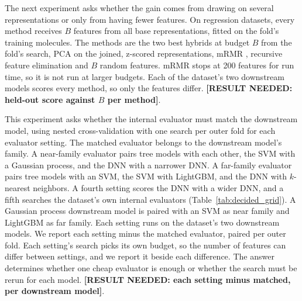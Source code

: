 The next experiment asks whether the gain comes from drawing on several representations or only from having fewer features. On regression datasets, every method receives $B$ features from all base representations, fitted on the fold's training molecules. %
The methods are the two best hybrids at budget $B$ from the fold's search, PCA on the joined, z-scored representations, mRMR \citep{Peng2005}, recursive feature elimination \citep{Guyon2002} and $B$ random features. mRMR stops at 200 features for run time, so it is not run at larger budgets. Each of the dataset's two downstream models scores every method, so only the features differ. \textbf{[RESULT NEEDED: held-out score against $B$ per method]}.

This experiment asks whether the internal evaluator must match the downstream model, using nested cross-validation with one search per outer fold for each evaluator setting. The matched evaluator belongs to the downstream model's family. A near-family evaluator pairs tree models with each other, the SVM with a Gaussian process, and the DNN with a narrower DNN. A far-family evaluator pairs tree models with an SVM, the SVM with LightGBM, and the DNN with $k$-nearest neighbors. %
A fourth setting scores the DNN with a wider DNN, and a fifth searches the dataset's own internal evaluators (Table~\ref{tab:decided_grid}). A Gaussian process downstream model is paired with an SVM as near family and LightGBM as far family. Each setting runs on the dataset's two downstream models. We report each setting minus the matched evaluator, paired per outer fold. Each setting's search picks its own budget, so the number of features can differ between settings, and we report it beside each difference. The answer determines whether one cheap evaluator is enough or whether the search must be rerun for each model. \textbf{[RESULT NEEDED: each setting minus matched, per downstream model]}.

